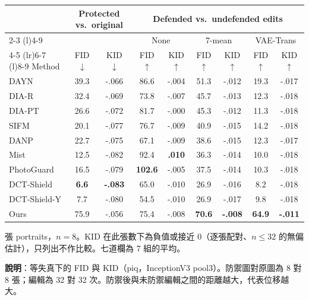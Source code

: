 \documentclass[10pt]{article}
\newcommand{\pend}[1]{#1}
\begin{document}
\begin{table}[h]
  \centering
  \footnotesize
  \setlength{\tabcolsep}{4pt}
  \begin{tabular}{l cc cc cc cc}
    \toprule
    & \multicolumn{2}{c}{Protected vs.\ original} & \multicolumn{6}{c}{Defended vs.\ undefended edits} \\
    \cmidrule(lr){2-3} \cmidrule(l){4-9}
    & & & \multicolumn{2}{c}{None} & \multicolumn{2}{c}{7-mean} & \multicolumn{2}{c}{VAE-Trans} \\
    \cmidrule(lr){4-5} \cmidrule(lr){6-7} \cmidrule(l){8-9}
    Method & FID $\downarrow$ & KID $\downarrow$ & FID $\uparrow$ & KID $\uparrow$ & FID $\uparrow$ & KID $\uparrow$ & FID $\uparrow$ & KID $\uparrow$ \\
    \midrule
    DAYN & \pend{39.3} & \pend{-.066} & \pend{86.6} & \pend{-.004} & \pend{51.3} & \pend{-.012} & \pend{19.3} & \pend{-.017} \\
    DIA-R & \pend{32.4} & \pend{-.069} & \pend{73.8} & \pend{-.007} & \pend{45.7} & \pend{-.013} & \pend{12.3} & \pend{-.018} \\
    DIA-PT & \pend{26.6} & \pend{-.072} & \pend{81.7} & \pend{-.000} & \pend{45.3} & \pend{-.012} & \pend{11.3} & \pend{-.018} \\
    SIFM & \pend{20.1} & \pend{-.077} & \pend{76.7} & \pend{-.009} & \pend{40.9} & \pend{-.015} & \pend{14.2} & \pend{-.018} \\
    DANP & \pend{22.7} & \pend{-.075} & \pend{67.1} & \pend{-.009} & \pend{38.6} & \pend{-.015} & \pend{12.3} & \pend{-.017} \\
    Mist & \pend{12.5} & \pend{-.082} & \pend{92.4} & \pend{\textbf{.010}} & \pend{36.3} & \pend{-.014} & \pend{10.0} & \pend{-.018} \\
    PhotoGuard & \pend{16.5} & \pend{-.079} & \pend{\textbf{102.6}} & \pend{-.005} & \pend{37.5} & \pend{-.014} & \pend{10.3} & \pend{-.018} \\
    DCT-Shield & \pend{\textbf{6.6}} & \pend{\textbf{-.083}} & \pend{65.0} & \pend{-.010} & \pend{26.9} & \pend{-.016} & \pend{8.2} & \pend{-.018} \\
    DCT-Shield-Y & \pend{7.7} & \pend{-.080} & \pend{54.5} & \pend{-.010} & \pend{26.9} & \pend{-.017} & \pend{9.8} & \pend{-.018} \\
    \midrule
    \rowcolor{oursrow}
    Ours & \pend{75.9} & \pend{-.056} & \pend{75.4} & \pend{-.008} & \pend{\textbf{70.6}} & \pend{\textbf{-.008}} & \pend{\textbf{64.9}} & \pend{\textbf{-.011}} \\
    \bottomrule
  \end{tabular}

   張 portraits，$n=8$。KID 在此張數下為負值或接近 0（逐張配對、$n \le 32$ 的無偏估計），只列出不作比較。七道欄為 7 組的平均。
\end{table}

\textbf{說明}：等失真下的 FID 與 KID（piq，InceptionV3 pool3）。防禦圖對原圖為 8 對 8 張；編輯為 32 對 32 次。防禦後與未防禦編輯之間的距離越大，代表位移越大。
\end{document}
